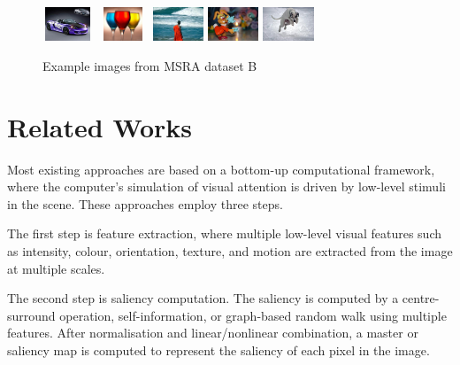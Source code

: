 \documentclass[10pt,twocolumn,letterpaper]{article}
\begin{document}
\begin{figure}[h]
\begin{center}
    \includegraphics[width=0.6in,height=0.4in]{./Figures/example_image/4_142_142916.jpg}
    \includegraphics[width=0.6in,height=0.4in]{./Figures/example_image/4_143_143262.jpg}
    \includegraphics[width=0.6in,height=0.4in]{./Figures/example_image/4_144_144604.jpg}
    \includegraphics[width=0.6in,height=0.4in]{./Figures/example_image/4_134_134777.jpg}
    \includegraphics[width=0.6in,height=0.4in]{./Figures/example_image/4_134_134664.jpg}\\
    \caption{Example images from MSRA dataset B}
    \end{center}
\end{figure}

\section{Related Works}
Most existing approaches are based on a bottom-up computational framework, where the computer's simulation of visual attention is driven by low-level stimuli in the scene.  %
These approaches employ three steps.

The first step is feature extraction, where multiple low-level visual features such as intensity, colour, orientation, texture, and motion are extracted from the image at multiple scales.

The second step is saliency computation. The saliency is computed by a centre-surround operation, self-information, or graph-based random walk using multiple features. After normalisation and linear/nonlinear combination, a master or saliency map is computed to represent the saliency of each pixel in the image. 
\end{document}
